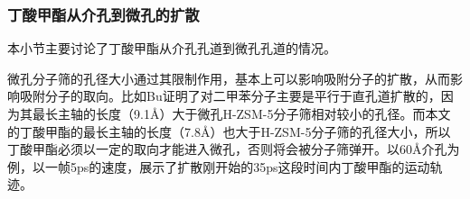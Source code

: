 \subsubsection{丁酸甲酯从介孔到微孔的扩散}
\par{本小节主要讨论了丁酸甲酯从介孔孔道到微孔孔道的情况。}
\par{微孔分子筛的孔径大小通过其限制作用，基本上可以影响吸附分子的扩散，从而影响吸附分子的取向。比如Bu\cite{bu2016diffusion}证明了对二甲苯分子主要是平行于直孔道扩散的，因为其最长主轴的长度（9.1Å）大于微孔H-ZSM-5分子筛相对较小的孔径。而本文的丁酸甲酯的最长主轴的长度（7.8Å）也大于H-ZSM-5分子筛的孔径大小，所以丁酸甲酯必须以一定的取向才能进入微孔，否则将会被分子筛弹开。以60Å介孔为例，以一帧5ps的速度，展示了扩散刚开始的35ps这段时间内丁酸甲酯的运动轨迹。}
\begin{figure}[H]
    \centering


\end{figure}
